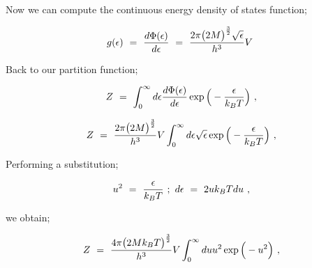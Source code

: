 \documentclass{article}
\begin{document}
Now we can compute the continuous energy density of states function;

\begin{equation} \label{eq:256}
g ( \epsilon ) \hspace{0.125cm} = \hspace{0.125cm}  \frac{d  \Phi ( \epsilon )}{d \epsilon} \hspace{0.125cm} = \hspace{0.125cm} \frac{ 2 \pi \big( 2 M \big)^{\frac{3}{2}} \sqrt{\epsilon}}{h^3} V \hspace{0.125cm}
\end{equation}

Back to our partition function;

\begin{equation} \label{eq:256}
Z \hspace{0.125cm} = \hspace{0.125cm} \int_{0}^{\infty} d \epsilon \frac{d  \Phi ( \epsilon )}{d \epsilon} \exp{\Big(-\frac{\epsilon}{k_B T} \Big)} \hspace{0.125cm} ,
\end{equation}

\begin{equation} \label{eq:256}
Z \hspace{0.125cm} = \hspace{0.125cm} \frac{ 2 \pi \big( 2 M \big)^{\frac{3}{2}}}{h^3} V \int_{0}^{\infty} d \epsilon \sqrt{\epsilon} \exp{\Big(-\frac{\epsilon}{k_B T} \Big)} \hspace{0.125cm} ,
\end{equation}

Performing a substitution;

\begin{equation} \label{eq:256}
u^2 \hspace{0.125cm} = \hspace{0.125cm} \frac{\epsilon}{k_B T} \hspace{0.125cm} ; \hspace{0.125cm} d \epsilon \hspace{0.125cm} = \hspace{0.125cm} 2 u k_B T d u \hspace{0.125cm} ,
\end{equation}

we obtain;

\begin{equation} \label{eq:256}
Z \hspace{0.125cm} = \hspace{0.125cm} \frac{ 4 \pi \big( 2 M k_B T \big)^{\frac{3}{2}}}{h^3} V \int_{0}^{\infty} d u u^2 \exp{\Big(-u^2 \Big)} \hspace{0.125cm} ,
\end{equation}
\end{document}
